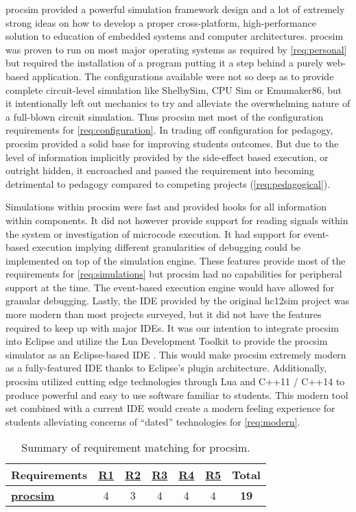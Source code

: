 procsim provided a powerful simulation framework design and a lot of extremely strong ideas on how to develop a proper cross-platform, high-performance solution to education of embedded systems and computer architectures. procsim  was proven to run on most major operating systems as required by \cref{req:personal} but required the installation of a program putting it a step behind a purely web-based application. The configurations available were not so deep as to provide complete circuit-level simulation like ShelbySim, CPU Sim or Emumaker86, but it intentionally left out mechanics to try and alleviate the overwhelming nature of a full-blown circuit simulation. Thus procsim met most of the configuration requirements for \cref{req:configuration}. In trading off configuration for pedagogy, procsim provided a solid base for improving students outcomes. But due to the level of information implicitly provided by the side-effect based execution, or outright hidden, it encroached and passed the requirement into becoming detrimental to pedagogy compared to competing projects (\cref{req:pedagogical}). 

Simulations within procsim were fast and provided hooks for all information within components. It did not however provide support for reading signals within the system or investigation of microcode execution. It had support for event-based execution implying different granularities of debugging could be implemented on top of the simulation engine. These features provide most of the requirements for \cref{req:simulations} but procsim had no capabilities for peripheral support at the time. The event-based execution engine would have allowed for granular debugging. Lastly, the IDE provided by the original hc12sim project was more modern than most projects surveyed, but it did not have the features required to keep up with major IDEs. It was our intention to integrate procsim into Eclipse and utilize the Lua Development Toolkit to provide the procsim simulator as an Eclipse-based IDE \cite{Eclipse:LDT}. This would make procsim extremely modern as a fully-featured IDE thanks to Eclipse's plugin architecture. Additionally, procsim utilized cutting edge technologies through Lua and C++11 / C++14 to produce powerful and easy to use software familiar to students. This modern tool set combined with a current IDE would create a modern feeling experience for students alleviating concerns of ``dated'' technologies for \cref{req:modern}.

\begin{table}[h!]
    \centering
    \begin{tabular}{l|cccccc}
        \textbf{Requirements} & \textbf{\hyperref[req:personal]{R1}} & \textbf{\hyperref[req:configuration]{R2}} & \textbf{\hyperref[req:pedagogical]{R3}} & \textbf{\hyperref[req:simulations]{R4}} & \textbf{\hyperref[req:modern]{R5}} & \textbf{Total} \\ \hline
        \textbf{\hyperref[ch:lua]{procsim}} & 
        4 & 3 & 4 & 4 & 4 & \textbf{19} \\
    \end{tabular}
    \caption{Summary of requirement matching for procsim.}
\end{table}